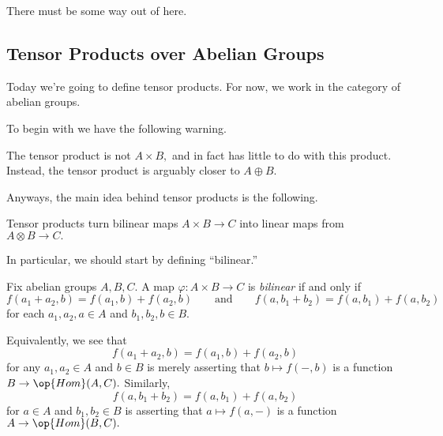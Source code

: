 \documentclass[../notes.tex]{subfiles}
\begin{document}
















There must be some way out of here.

\subsection{Tensor Products over Abelian Groups}
Today we're going to define tensor products. For now, we work in the category of abelian groups.

To begin with we have the following warning.
\begin{warn}
	The tensor product is not $A\times B,$ and in fact has little to do with this product. Instead, the tensor product is arguably closer to $A\oplus B.$
\end{warn}
Anyways, the main idea behind tensor products is the following.
\begin{idea}
	Tensor products turn bilinear maps $A\times B\to C$ into linear maps from $A\otimes B\to C.$
\end{idea}
In particular, we should start by defining ``bilinear.''
\begin{definition}[Bilinear]
	Fix abelian groups $A,B,C.$ A map $\varphi:A\times B\to C$ is \textit{bilinear} if and only if
	\[f(a_1+a_2,b)=f(a_1,b)+f(a_2,b)\qquad\text{and}\qquad f(a,b_1+b_2)=f(a,b_1)+f(a,b_2)\]
	for each $a_1,a_2,a\in A$ and $b_1,b_2,b\in B.$
\end{definition}
Equivalently, we see that
\[f(a_1+a_2,b)=f(a_1,b)+f(a_2,b)\]
for any $a_1,a_2\in A$ and $b\in B$ is merely asserting that $b\mapsto f(-,b)$ is a function $B\to\op{Hom}(A,C).$ Similarly,
\[f(a,b_1+b_2)=f(a,b_1)+f(a,b_2)\]
for $a\in A$ and $b_1,b_2\in B$ is asserting that $a\mapsto f(a,-)$ is a function $A\to\op{Hom}(B,C).$
\end{document}
